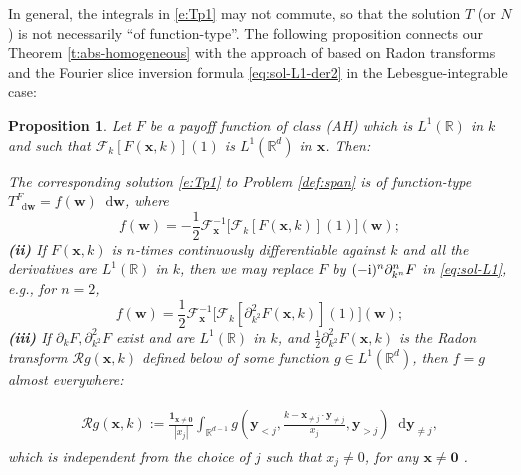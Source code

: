 \documentclass[11pt,A4,twoside]{article}
\newcommand\ind{\mathbf{1}}
\numberwithin{equation}{section}
\renewcommand{\b}[1]{{\color{blue}#1}}
\newcommand{\F}{\mathcal{F}}
\renewcommand*\d{\mathop{}\!\mathrm{d}}
\newcommand{\x}{\mathbf{x}}
\newcommand{\y}{\mathbf{y}}
\newcommand{\w}{\mathbf{w}}
\newcommand{\R}{\mathbbm{R}}
\newcommand{\Ra}{\mathcal{R}}
\newcommand{\beqa}{\begin{eqnarray}}
\newcommand{\eeqa}{\end{eqnarray}}
\def\bal{\begin{aligned}}
\def\eal{\end{aligned}}
\def\bll#1{
\beqa\label{#1}\bal
}\def\lel{\eal\eeqa}
\newcommand{\beql}[1]{\bll{#1}}
\newcommand{\eeql}{\lel}
\newtheorem{proposition}[theorem]{Proposition}
\theoremstyle{definition}
\theoremstyle{remark}
\def\AHl{{\rm AHa}\xspace}\def\AHl{{\rm (AH)}\xspace}
\def\R{\mathbb{R}}
\def\thef{\b{f}}\def\thef{f}
\def\thermi{{\rm i}}%
\begin{document}
In general, the integrals in \eqref{e:Tp1} may not commute, so that the solution $T$ (or $N$) is not necessarily ``of function-type''.
The following proposition connects our Theorem \ref{t:abs-homogeneous} with the approach of \citet{bossu2021static} based on Radon transforms and the Fourier slice inversion formula \eqref{eq:sol-L1-der2} in the  Lebesgue-integrable case:
\begin{proposition} \label{prop:sol-L1}
    Let $F$ be a payoff function of class \AHl which is $L^1(\R)$ in $k$ and such that $\F_k[ F(\x,k)](1)$ is $L^1(\R^d)$ in $\x$.  Then:

        The corresponding solution \eqref{e:Tp1} to Problem \ref{def:span} is of function-type  $T^F_{\d \w} = \thef(\w)\d\w$, where
    \begin{equation}    \label{eq:sol-L1}
        \thef(\w) = -\frac{1}{2}\F^{-1}_\x\big[\F_k[ F(\x,k)](1)\big] (\w);
    \end{equation}
{\emph{\textbf{(ii)}}}
If $F(\x,k)$ is $n$-times continuously differentiable against $k$ and all the derivatives are $L^1(\R)$ in $k$, then we may replace $F$ by $(-\thermi  )^n \partial^n_{k^n} F$ in \eqref{eq:sol-L1}, e.g., for $n=2$,
    \begin{equation}    \label{eq:sol-L1-der2}
        \thef(\w) = \frac{1}{2}\F^{-1}_\x\big[\F_k[ \partial^2_{k^2} F(\x,k)](1)\big] (\w);
    \end{equation}
{\emph{\textbf{(iii)}}}
    If $\partial_k F, \partial^2_{k^2} F$ exist and are $L^1(\R)$ in $k$, and $\frac12\partial^2_{k^2} F(\x,k) $ is the Radon transform $\Ra g(\x,k)$ defined below of some function $g\in L^1(\R^d)$, then $f=g$ almost everywhere:
    \beql{e:defrad}
      \Ra g(\x,k) := \frac{\ind_{\x\ne\mathbf0}}{|x_j|} \int_{\R^{d-1}}  g\left(\y_{<j},\frac{k- \x_{\ne j}  \cdot \y_{\ne j}}{x_j},\y_{>j}\right)  \d \y_{\ne j},
    \eeql
    which is independent from the choice of $j$ such that $x_j \neq 0$, for any $\x\ne\mathbf 0$ \citep[page 130]{rubin}.
\end{proposition}
\end{document}
